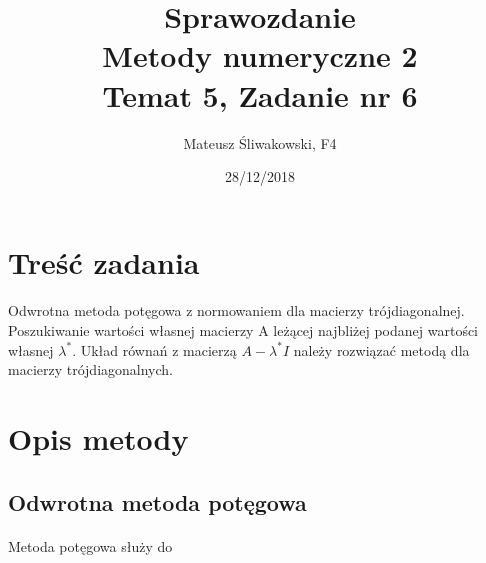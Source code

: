 \documentclass{article}
\title{Sprawozdanie \\Metody numeryczne 2 \\\textbf{Temat 5, Zadanie nr 6}}
\date{28/12/2018}
\author{Mateusz Śliwakowski, F4}
\begin{document}
  \maketitle
 	  \newpage

\section{Treść zadania}
\paragraph{}
Odwrotna metoda potęgowa z normowaniem dla macierzy trójdiagonalnej. Poszukiwanie wartości własnej macierzy A leżącej najbliżej podanej wartości własnej $\lambda^*$. Układ równań z macierzą $A - \lambda^*I$ należy rozwiązać metodą dla macierzy trójdiagonalnych.
\section{Opis metody}
\subsection{Odwrotna metoda potęgowa}
\paragraph{}
Metoda potęgowa służy do
\end{document}
